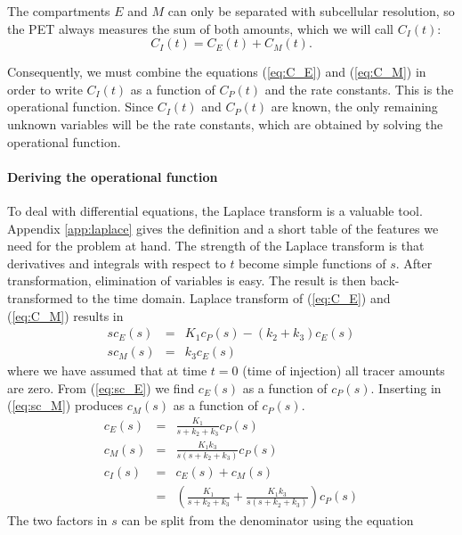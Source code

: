 The compartments $E$ and $M$ can only be separated with subcellular
resolution, so the PET always measures the sum of both amounts, which we will
call $C_I(t)$:
\begin{equation}
  C_I(t) = C_E(t) + C_M(t).
\end{equation}

Consequently, we must combine the equations (\ref{eq:C_E}) and (\ref{eq:C_M})
in order to write $C_I(t)$ as a function of $C_P(t)$ and the rate
constants. This is the operational function. Since $C_I(t)$ and $C_P(t)$ are
known, the only remaining unknown variables will be the rate constants, which
are obtained by solving the operational function.

\paragraph{Deriving the operational function\\}
To deal with differential equations, the Laplace transform is a valuable
tool. Appendix \ref{app:laplace} gives the definition and a short table of the
features we need for the problem at hand. The strength of the Laplace
transform is that derivatives and integrals with respect to $t$ become simple
functions of $s$. After transformation, elimination of variables is easy. The
result is then back-transformed to the time domain.  Laplace transform of
(\ref{eq:C_E}) and (\ref{eq:C_M}) results in
\begin{eqnarray}
  s c_E(s) & = & K_1 c_P(s) - (k_2 + k_3) c_E(s) \label{eq:sc_E}\\
  s c_M(s) & = & k_3 c_E(s)  \label{eq:sc_M}
\end{eqnarray}
where we have assumed that at time $t=0$ (time of injection) all tracer
amounts are zero.  From (\ref{eq:sc_E}) we find $c_E(s)$ as a function of
$c_P(s)$. Inserting in (\ref{eq:sc_M}) produces $c_M(s)$ as a function of
$c_P(s)$.
\begin{eqnarray}
  c_E(s) & = & \frac{K_1}{s + k_2 + k_3} c_P(s)\\
  c_M(s) & = & \frac{K_1 k_3}{s (s + k_2 + k_3)} c_P(s)\\
  c_I(s) & = & c_E(s) + c_M(s) \\
         & = & \left( \frac{K_1}{s + k_2 + k_3} 
                    + \frac{K_1 k_3}{s (s + k_2 + k_3)}\right) c_P(s)
           \label{eq:c_I}
\end{eqnarray}
The two factors in $s$ can be split from the denominator using the equation
